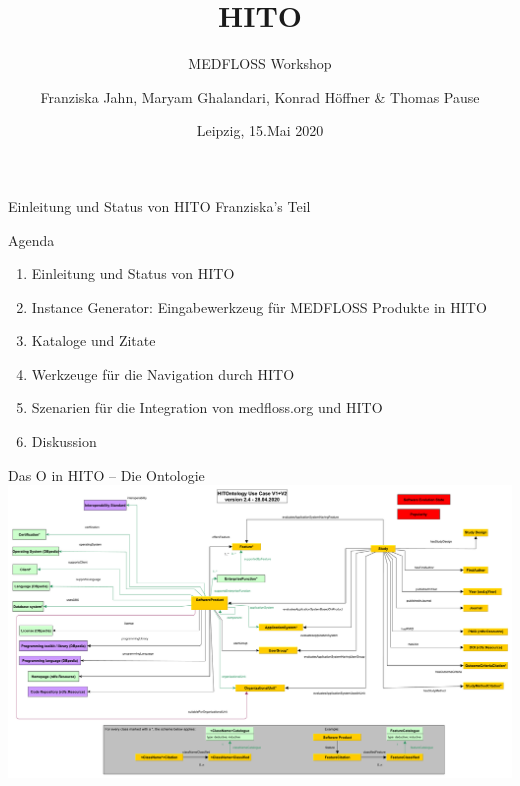 \documentclass[aspectratio=1610,12pt]{beamer}
\author{Franziska Jahn, Maryam Ghalandari, Konrad Höffner \& Thomas Pause}
\date{Leipzig, 15.Mai 2020}
\title{HITO}
\subtitle{MEDFLOSS Workshop}
\begin{document}
\begin{frame}
\titlepage
\end{frame}

\begin{frame}{Einleitung und Status von HITO}
  \centering
  \huge Franziska's Teil
\end{frame}

\begin{frame}{Agenda}
\begin{spacing}{1.25}
\begin{enumerate}
\item Einleitung und Status von HITO
\item Instance Generator: Eingabewerkzeug für MEDFLOSS Produkte in HITO
\item Kataloge und Zitate
\item Werkzeuge für die Navigation durch HITO
\item Szenarien für die Integration von medfloss.org und HITO
\item Diskussion
\end{enumerate}
\end{spacing}
\end{frame}

\begin{frame}{Das O in HITO -- Die Ontologie}
\centering
\includegraphics[width=.95\textwidth]{img/HITontology.pdf}
\end{frame}
\end{document}
